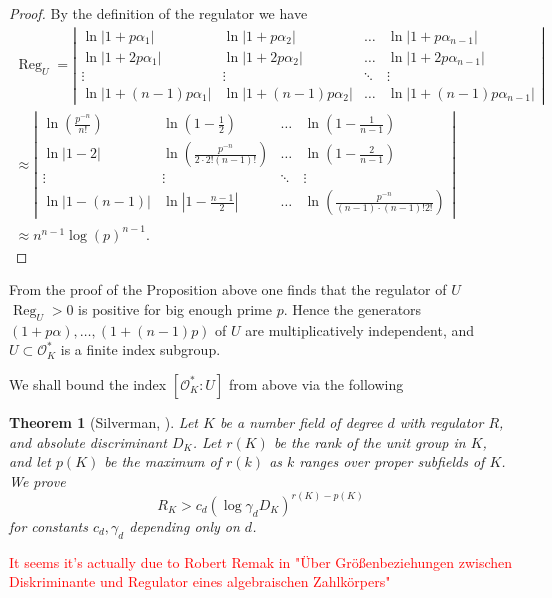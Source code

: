 \documentclass[a4paper]{article}
\newcommand{\red}{\textcolor{red}} %
\newtheorem{Thm}{Theorem}[section]
\renewcommand{\O}{\mathcal{O}}        %
\DeclareMathOperator{\Reg}{Reg}        %
\begin{document}
\begin{proof}
By the definition of the regulator we have
\begin{multline}
\Reg_U = 
\left|
\begin{array}{cccc}
\ln |1 + p \alpha_1| 	& \ln |1 + p \alpha_2| & \ldots & \ln |1 + p \alpha_{n-1}| \\
\ln |1 + 2 p \alpha_1| 	& \ln |1 + 2 p \alpha_2| & \ldots &  \ln |1 + 2 p \alpha_{n-1}| \\
\vdots 	& \vdots & \ddots &  \vdots \\
\ln |1 + (n-1) p \alpha_1| 	& \ln |1 + (n-1) p \alpha_2| & \ldots &  \ln |1 + (n-1) p \alpha_{n-1}| 
\end{array} 
\right|
\\
\approx
\left|
\begin{array}{cccc}
\ln \left( \frac{ p^{-n}}{n!}  \right)  	& \ln \left( 1 - \frac{1}{2} \right)  & \ldots &  \ln \left( 1 - \frac{1}{n - 1} \right)  \\
\ln |1 - 2| 	& \ln \left( \frac{p^{-n} }{2\cdot  2! (n-1)!} \right)  & \ldots &  \ln \left( 1 - \frac{2}{n-1} \right)  \\
\vdots 	& \vdots & \ddots &  \vdots \\
\ln |1 - (n-1) | 	& \ln |1 - \frac{n-1}2| & \ldots &  \ln \left( \frac{p^{-n}}{(n-1)\cdot (n-1)! 2!} \right) 
\end{array} 
\right| \\
\approx n^{n-1} \log(p)^{n-1} 
.\end{multline}
\end{proof}
From the proof of the Proposition above one finds that the regulator of $U$ $ \Reg_U > 0 $ is positive for big enough prime $p$.
Hence the generators $(1 + p \alpha), \ldots, (1 + (n-1) p)$ of $U$ are multiplicatively independent, and $U \subset \O_K^*$ is a finite index subgroup.

We shall bound the index $[\O_K^* : U]$ from above via the following
\begin{Thm}[Silverman, \cite{silverman1984inequality}]
Let $K$ be a number field of degree $d$ with regulator $R$, and absolute discriminant $D_K$. 
Let $r(K)$ be the rank of the unit group in $K$, and let $p(K)$ be the maximum of $r(k)$ as $k$ ranges over proper subfields of $K$. 
We prove 
\[
R_K > c_d (\log \gamma_d  D_K )^{r(K) - p(K)} 
\] 
for constants $c_d, \gamma_d$ depending only on $d$. 
\end{Thm}
\red{It seems it's actually due to 
Robert Remak in
"Über Größenbeziehungen zwischen Diskriminante
und Regulator eines algebraischen Zahlkörpers" }
\end{document}
